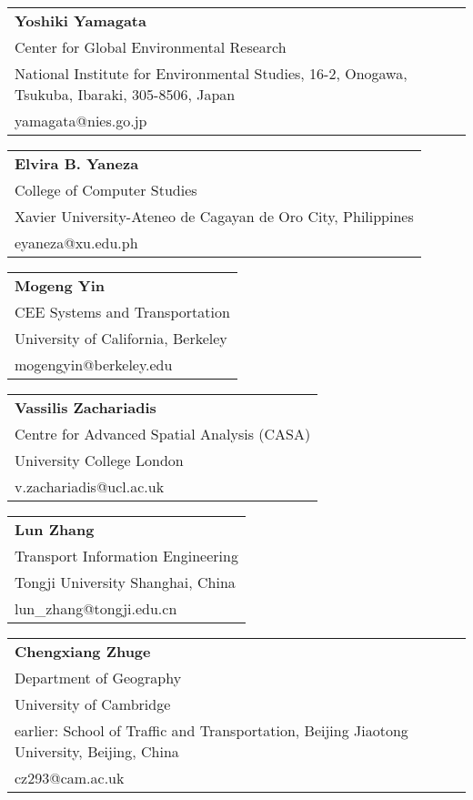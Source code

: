 \begin{tabular}[width=0.48\textwidth]{@{}l}
\textbf{Yoshiki Yamagata} \\
Center for Global Environmental Research \\
National Institute for Environmental Studies, 16-2, Onogawa, Tsukuba, Ibaraki, 305-8506, Japan \\
yamagata@nies.go.jp  \\
\end{tabular}

\begin{tabular}[width=0.48\textwidth]{@{}l}
\textbf{Elvira B. Yaneza} \\
College of Computer Studies \\
Xavier University-Ateneo de Cagayan de Oro City, Philippines \\
eyaneza@xu.edu.ph  \\
\end{tabular}

\begin{tabular}[width=0.48\textwidth]{@{}l}
\textbf{Mogeng Yin} \\
CEE Systems and Transportation \\
University of California, Berkeley \\
mogengyin@berkeley.edu \\
\end{tabular}

\begin{tabular}[width=0.48\textwidth]{@{}l}
\textbf{Vassilis Zachariadis} \\
Centre for Advanced Spatial Analysis (CASA) \\
University College London \\
v.zachariadis@ucl.ac.uk \\
\end{tabular}

\begin{tabular}[width=0.48\textwidth]{@{}l}
\textbf{Lun Zhang} \\
Transport Information Engineering \\
Tongji University Shanghai, China \\
lun\_zhang@tongji.edu.cn \\
\end{tabular}

\begin{tabular}[width=0.48\textwidth]{@{}l}
\textbf{Chengxiang Zhuge} \\
Department of Geography \\
University of Cambridge\\
earlier: School of Traffic and Transportation, Beijing Jiaotong University, Beijing, China \\
cz293@cam.ac.uk \\
\end{tabular}

